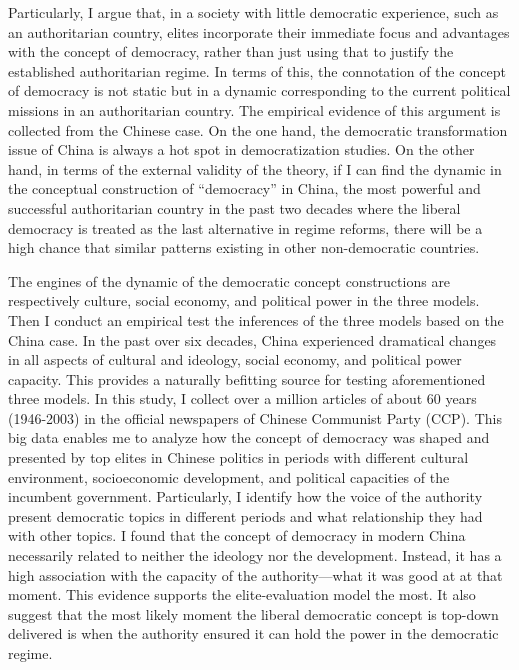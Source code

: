 \documentclass[abstracton,UTF8]{ctexart}
\begin{document}
Particularly, I argue that, in a society with little democratic experience, such as an authoritarian country, elites incorporate their immediate focus and advantages with the concept of democracy, rather than just using that to justify the established authoritarian regime. In terms of this, the connotation of the concept of democracy is not static but in a dynamic corresponding to the current political missions in an authoritarian country. The empirical evidence of this argument is collected from the Chinese case. On the one hand, the democratic transformation issue of China is always a hot spot in democratization studies\citep[for instance, see ][]{Dickson2000,Dickson1997,Pei1995,Chen2002a,White1994,Howell1998,Tien1999,Zheng1999,Zheng2004}. On the other hand, in terms of the external validity of the theory, if I can find the dynamic in the conceptual construction of ``democracy'' in China, the most powerful and successful authoritarian country in the past two decades where the liberal democracy is treated as the last alternative in regime reforms, there will be a high chance that similar patterns existing in other non-democratic countries.



 The engines of the dynamic of the democratic concept constructions are respectively culture, social economy, and political power in the three models. Then I conduct an empirical test the inferences of the three models based on the China case. In the past over six decades, China experienced dramatical changes in all aspects of cultural and ideology, social economy, and political power capacity. This provides a naturally befitting source for testing aforementioned three models. In this study, I collect over a million articles of about 60 years (1946-2003) in the official newspapers of Chinese Communist Party (CCP). This big data enables me to analyze how the concept of democracy was shaped and presented by top elites in Chinese politics in periods with different cultural environment, socioeconomic development, and political capacities of the incumbent government. Particularly, I identify how the voice of the authority present democratic topics in different periods and what relationship they had with other topics. I found that the concept of democracy in modern China necessarily related to neither the ideology nor the development. Instead, it has a high association with the capacity of the authority---what it was good at at that moment. This evidence supports the elite-evaluation model the most. It also suggest that the most likely moment the liberal democratic concept is top-down delivered is when the authority ensured it can hold the power in the democratic regime. 
\end{document}
